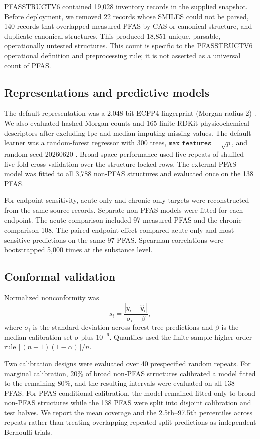 \documentclass[journal=esthag,manuscript=article,margin=1in]{achemso}
\begin{document}
PFASSTRUCTV6 contained 19,028 inventory records in the supplied snapshot. Before deployment, we removed 22 records whose SMILES could not be parsed, 140 records that overlapped measured PFAS by CAS or canonical structure, and duplicate canonical structures. This produced 18,851 unique, parsable, operationally untested structures. This count is specific to the PFASSTRUCTV6 operational definition and preprocessing rule; it is not asserted as a universal count of PFAS.

\subsection{Representations and predictive models}

The default representation was a 2,048-bit ECFP4 fingerprint (Morgan radius 2) \cite{rogers2010ecfp}. We also evaluated hashed Morgan counts and 165 finite RDKit physicochemical descriptors after excluding Ipc and median-imputing missing values. The default learner was a random-forest regressor with 300 trees, $\texttt{max\_features}=\sqrt{p}$, and random seed 20260620 \cite{breiman2001random,sklearn}. Broad-space performance used five repeats of shuffled five-fold cross-validation over the structure-locked rows. The external PFAS model was fitted to all 3,788 non-PFAS structures and evaluated once on the 138 PFAS.

For endpoint sensitivity, acute-only and chronic-only targets were reconstructed from the same source records. Separate non-PFAS models were fitted for each endpoint. The acute comparison included 97 measured PFAS and the chronic comparison 108. The paired endpoint effect compared acute-only and most-sensitive predictions on the same 97 PFAS. Spearman correlations were bootstrapped 5,000 times at the substance level.

\subsection{Conformal validation}

Normalized nonconformity was
\begin{equation}
s_i=\frac{|y_i-\hat y_i|}{\sigma_i+\beta},
\end{equation}
where $\sigma_i$ is the standard deviation across forest-tree predictions and $\beta$ is the median calibration-set $\sigma$ plus $10^{-6}$. Quantiles used the finite-sample higher-order rule $\lceil(n+1)(1-\alpha)\rceil/n$.

Two calibration designs were evaluated over 40 prespecified random repeats. For marginal calibration, 20\% of broad non-PFAS structures calibrated a model fitted to the remaining 80\%, and the resulting intervals were evaluated on all 138 PFAS. For PFAS-conditional calibration, the model remained fitted only to broad non-PFAS structures while the 138 PFAS were split into disjoint calibration and test halves. We report the mean coverage and the 2.5th--97.5th percentiles across repeats rather than treating overlapping repeated-split predictions as independent Bernoulli trials.
\end{document}
